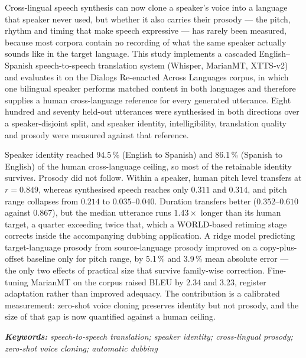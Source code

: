 
{\singlespacing
Cross-lingual speech synthesis can now clone a speaker's voice into a language that speaker never
used, but whether it also carries their prosody --- the pitch, rhythm and timing that make speech
expressive --- has rarely been measured, because most corpora contain no recording of what the same
speaker actually sounds like in the target language. This study implements a cascaded
English--Spanish speech-to-speech translation system (Whisper, MarianMT, XTTS-v2) and evaluates it
on the Dialogs Re-enacted Across Languages corpus, in which one bilingual speaker performs matched
content in both languages and therefore supplies a human cross-language reference for every
generated utterance. Eight hundred and seventy held-out utterances were synthesised in both
directions over a speaker-disjoint split, and speaker identity, intelligibility, translation
quality and prosody were measured against that reference.

Speaker identity reached 94.5\,\% (English to Spanish) and 86.1\,\% (Spanish to English) of the
human cross-language ceiling, so most of the retainable identity survives. Prosody did not follow. Within a speaker, human pitch level transfers at $r=0.849$,
whereas synthesised speech reaches only $0.311$ and $0.314$, and pitch range collapses from $0.214$
to $0.035$--$0.040$. Duration transfers better ($0.352$--$0.610$ against $0.867$), but
the median utterance runs $1.43\times$ longer than its human target, a quarter exceeding
twice that, which a WORLD-based retiming stage corrects inside the accompanying dubbing
application. A ridge model predicting target-language prosody from source-language prosody improved
on a copy-plus-offset baseline only for pitch range, by 5.1\,\% and 3.9\,\% mean absolute error ---
the only two effects of practical size that survive family-wise correction. Fine-tuning MarianMT on
the corpus raised BLEU by 2.34 and 3.23, register adaptation rather than improved adequacy.
The contribution is a calibrated measurement: zero-shot voice cloning preserves identity but not
prosody, and the size of that gap is now quantified against a human ceiling.
\par}

\vspace{1.0\baselineskip}
\noindent\textbf{\textit{Keywords:}} \textit{speech-to-speech translation; speaker identity;
cross-lingual prosody; zero-shot voice cloning; automatic dubbing}
